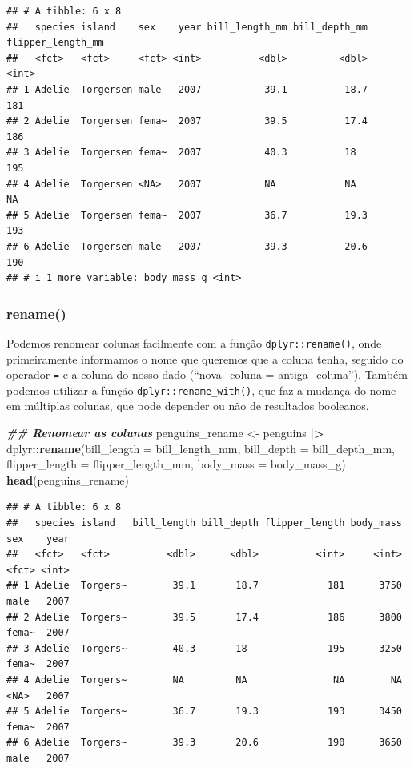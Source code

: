 \documentclass[
]{article}
\newenvironment{Shaded}{\begin{snugshade}}{\end{snugshade}}
\newcommand{\AttributeTok}[1]{\textcolor[rgb]{0.13,0.29,0.53}{#1}}
\newcommand{\DocumentationTok}[1]{\textcolor[rgb]{0.56,0.35,0.01}{\textbf{\textit{#1}}}}
\newcommand{\FunctionTok}[1]{\textcolor[rgb]{0.13,0.29,0.53}{\textbf{#1}}}
\newcommand{\NormalTok}[1]{#1}
\newcommand{\OtherTok}[1]{\textcolor[rgb]{0.56,0.35,0.01}{#1}}
\newcommand{\SpecialCharTok}[1]{\textcolor[rgb]{0.81,0.36,0.00}{\textbf{#1}}}
\begin{document}
\begin{verbatim}
## # A tibble: 6 x 8
##   species island    sex    year bill_length_mm bill_depth_mm flipper_length_mm
##   <fct>   <fct>     <fct> <int>          <dbl>         <dbl>             <int>
## 1 Adelie  Torgersen male   2007           39.1          18.7               181
## 2 Adelie  Torgersen fema~  2007           39.5          17.4               186
## 3 Adelie  Torgersen fema~  2007           40.3          18                 195
## 4 Adelie  Torgersen <NA>   2007           NA            NA                  NA
## 5 Adelie  Torgersen fema~  2007           36.7          19.3               193
## 6 Adelie  Torgersen male   2007           39.3          20.6               190
## # i 1 more variable: body_mass_g <int>
\end{verbatim}

\hypertarget{rename}{%
\subsubsection{rename()}\label{rename}}

Podemos renomear colunas facilmente com a função \texttt{dplyr::rename()}, onde primeiramente informamos o nome que queremos que a coluna tenha, seguido do operador \texttt{=} e a coluna do nosso dado (``nova\_coluna = antiga\_coluna''). Também podemos utilizar a função \texttt{dplyr::rename\_with()}, que faz a mudança do nome em múltiplas colunas, que pode depender ou não de resultados booleanos.

\begin{Shaded}
\begin{Highlighting}[]
\DocumentationTok{\#\# Renomear as colunas}
\NormalTok{penguins\_rename }\OtherTok{\textless{}{-}}\NormalTok{ penguins }\SpecialCharTok{|\textgreater{}} 
\NormalTok{    dplyr}\SpecialCharTok{::}\FunctionTok{rename}\NormalTok{(}\AttributeTok{bill\_length =}\NormalTok{ bill\_length\_mm,}
                  \AttributeTok{bill\_depth =}\NormalTok{ bill\_depth\_mm,}
                  \AttributeTok{flipper\_length =}\NormalTok{ flipper\_length\_mm,}
                  \AttributeTok{body\_mass =}\NormalTok{ body\_mass\_g)}
\FunctionTok{head}\NormalTok{(penguins\_rename)}
\end{Highlighting}
\end{Shaded}

\begin{verbatim}
## # A tibble: 6 x 8
##   species island   bill_length bill_depth flipper_length body_mass sex    year
##   <fct>   <fct>          <dbl>      <dbl>          <int>     <int> <fct> <int>
## 1 Adelie  Torgers~        39.1       18.7            181      3750 male   2007
## 2 Adelie  Torgers~        39.5       17.4            186      3800 fema~  2007
## 3 Adelie  Torgers~        40.3       18              195      3250 fema~  2007
## 4 Adelie  Torgers~        NA         NA               NA        NA <NA>   2007
## 5 Adelie  Torgers~        36.7       19.3            193      3450 fema~  2007
## 6 Adelie  Torgers~        39.3       20.6            190      3650 male   2007
\end{verbatim}
\end{document}
